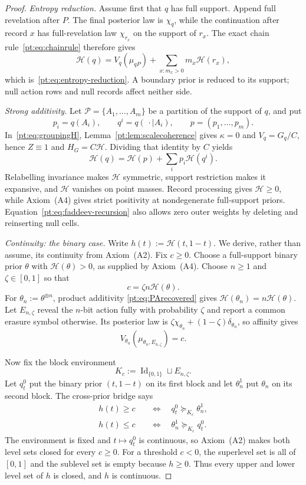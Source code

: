 \documentclass[11pt,a4paper]{article}
\theoremstyle{definition}
\newcommand{\Id}{\operatorname{Id}}
\newcommand{\1}{\mathbf 1}
\begin{document}
\begin{proof}
\emph{Entropy reduction.}
Assume first that $q$ has full support.  Append full revelation after $P$.
The final posterior law is $\chi_q$, while the continuation after record $x$
has full-revelation law $\chi_{r_x}$ on the support of $r_x$.  The exact
chain rule~\eqref{pt:eq:chainrule} therefore gives
\[
 \mathcal H(q)=V_q(\mu_{qP})
 +\sum_{x:m_x>0}m_x\mathcal H(r_x),
\]
which is~\eqref{pt:eq:entropy-reduction}.  A boundary prior is reduced to its
support; null action rows and null records affect neither side.

\emph{Strong additivity.}
Let $\mathcal P=\{A_1,\ldots,A_m\}$ be a partition of the support of $q$,
and put
\[
 p_i=q(A_i),\qquad q^i=q(\,\cdot\mid A_i),\qquad
 p=(p_1,\ldots,p_m).
\]
In~\eqref{pt:eq:groupingH}, Lemma~\ref{pt:lem:scalecoherence} gives
$\kappa=0$ and $V_q=G_q/C$, hence $Z\equiv1$ and $H_G=C\mathcal H$.  Dividing that identity by $C$ yields
\begin{equation}
 \mathcal H(q)=\mathcal H(p)+\sum_i p_i\mathcal H(q^i).
\tag{FA}\label{pt:eq:faddeev-recursion}
\end{equation}
Relabelling invariance makes $\mathcal H$ symmetric, support restriction makes
it expansive, and $\mathcal H$ vanishes on point masses.  Record processing
gives $\mathcal H\ge0$, while Axiom~\textup{(A4)} gives strict positivity at
nondegenerate full-support priors.  Equation~\eqref{pt:eq:faddeev-recursion}
also allows zero outer weights by deleting and reinserting null cells.

\emph{Continuity: the binary case.}
Write $h(t):=\mathcal H(t,1-t)$.  We derive, rather than assume, its
continuity from Axiom~\textup{(A2)}.  Fix $c\ge0$.  Choose a full-support
binary prior $\theta$ with $\mathcal H(\theta)>0$, as supplied by
Axiom~\textup{(A4)}.  Choose $n\ge1$ and $\zeta\in[0,1]$ so that
\[
 c=\zeta n\mathcal H(\theta).
\]
For $\theta_n:=\theta^{\otimes n}$, product additivity
\eqref{pt:eq:PArecovered} gives
$\mathcal H(\theta_n)=n\mathcal H(\theta)$.  Let $E_{n,\zeta}$ reveal the
$n$-bit action fully with probability $\zeta$ and report a common erasure
symbol otherwise.  Its posterior law is
$\zeta\chi_{\theta_n}+(1-\zeta)\delta_{\theta_n}$, so affinity gives
\[
 V_{\theta_n}(\mu_{\theta_n,E_{n,\zeta}})=c.
\]

Now fix the block environment
\[
 K_c:=\Id_{\{0,1\}}\sqcup E_{n,\zeta}.
\]
Let $q_t^0$ put the binary prior $(t,1-t)$ on its first block and let
$\theta_n^1$ put $\theta_n$ on its second block.  The cross-prior bridge says
\begin{align*}
 h(t)\ge c&\quad\Longleftrightarrow\quad q_t^0\succeq_{K_c}\theta_n^1,\\
 h(t)\le c&\quad\Longleftrightarrow\quad \theta_n^1\succeq_{K_c}q_t^0.
\end{align*}
The environment is fixed and $t\mapsto q_t^0$ is continuous, so
Axiom~\textup{(A2)} makes both level sets closed for every $c\ge0$.  For a
threshold $c<0$, the superlevel set is all of $[0,1]$ and the sublevel set is
empty because $h\ge0$.
Thus every upper and lower level set of $h$ is closed, and $h$ is continuous.


\end{proof}
\end{document}
